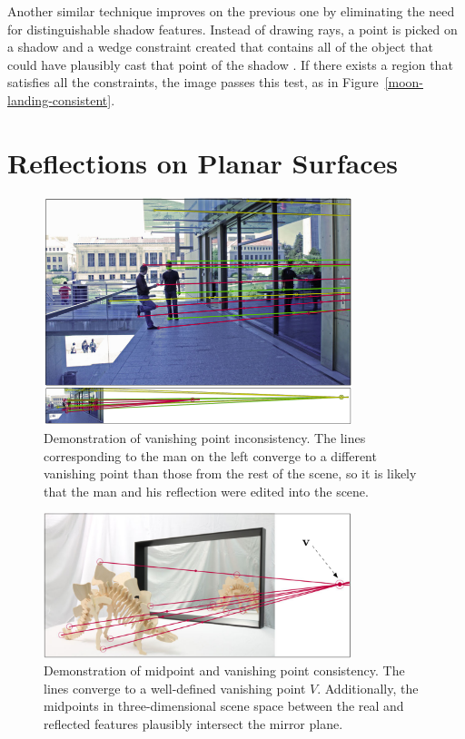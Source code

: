 \documentclass{thesis}
\begin{document}
Another similar technique improves on the previous one by eliminating the need for distinguishable shadow features. Instead of drawing rays, a point is picked on a shadow and a wedge constraint created that contains all of the object that could have plausibly cast that point of the shadow \cite{kee2013exposing}. If there exists a region that satisfies all the constraints, the image passes this test, as in Figure~\ref{moon-landing-consistent}.

\section{Reflections on Planar Surfaces}
\label{sec:planar-reflections}
\begin{figure}[h]
	\centering
    	\includegraphics[width=0.8\textwidth]{planar-vanishing-point-forged}
	\caption{Demonstration of vanishing point inconsistency. The lines corresponding to the man on the left converge to a different vanishing point than those from the rest of the scene, so it is likely that the man and his reflection were edited into the scene. \cite[Fig.~1]{obrien12}}
	\label{planar-vanishing-point-forged}
\end{figure}

\begin{figure}[h]
	\centering
    	\includegraphics[width=0.8\textwidth]{planar-midpoint-genuine}
	\caption{Demonstration of midpoint and vanishing point consistency. The lines converge to a well-defined vanishing point $V$. Additionally, the midpoints in three-dimensional scene space between the real and reflected features plausibly intersect the mirror plane. \cite[Fig.~3]{obrien12}}
	\label{planar-midpoint-genuine}
\end{figure}
\end{document}

